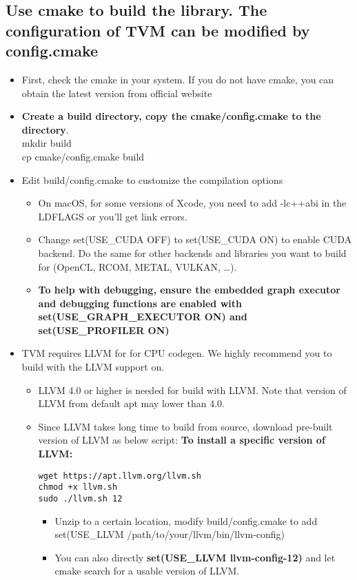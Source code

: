 \documentclass{article}
\begin{document}
\subsection{Use cmake to build the library. The configuration of TVM can be modified by config.cmake}
\begin{itemize}
\item First, check the cmake in your system. If you do not have cmake, you can obtain the latest version from official website
\item \textbf{Create a build directory, copy the cmake/config.cmake to the directory}.\\
    mkdir build\\
    cp cmake/config.cmake build\\
\item Edit build/config.cmake to customize the compilation options
\begin{itemize}
    \item On macOS, for some versions of Xcode, you need to add -lc++abi in the LDFLAGS or you’ll get link errors.
    \item Change set(USE\_CUDA OFF) to set(USE\_CUDA ON) to enable CUDA backend. Do the same for other backends and libraries you want to build for (OpenCL, RCOM, METAL, VULKAN, …).
    \item \textbf{To help with debugging, ensure the embedded graph executor and debugging functions are enabled with set(USE\_GRAPH\_EXECUTOR ON) and set(USE\_PROFILER ON)}
\end{itemize}

\item TVM requires LLVM for for CPU codegen. We highly recommend you to build with the LLVM support on.
    \begin{itemize}
        \item LLVM 4.0 or higher is needed for build with LLVM. Note that version of LLVM from default apt may lower than 4.0.
        \item Since LLVM takes long time to build from source, download pre-built version of LLVM as below script:
        \textbf{To install a specific version of LLVM:}
        \begin{lstlisting}
wget https://apt.llvm.org/llvm.sh
chmod +x llvm.sh
sudo ./llvm.sh 12
        \end{lstlisting}
            \begin{itemize}
                \item Unzip to a certain location, modify build/config.cmake to add set(USE\_LLVM /path/to/your/llvm/bin/llvm-config)
                \item You can also directly \textbf{set(USE\_LLVM llvm-config-12)} and let cmake search for a usable version of LLVM.
            \end{itemize}
    

\end{itemize}
\end{itemize}
\end{document}
